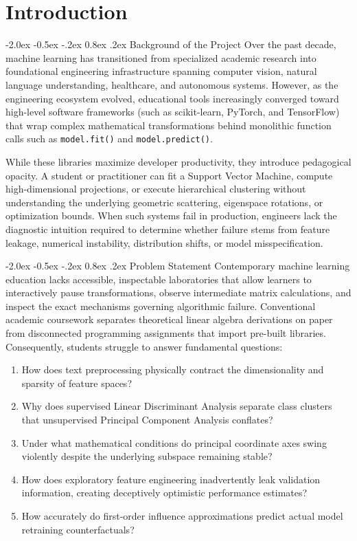 \documentclass[12pt,a4paper]{report}
\makeatletter
\newenvironment{tightenumerate}{%
  \begin{enumerate}%
    \setlength{\itemsep}{1.5pt}%
    \setlength{\parskip}{0pt}%
    \setlength{\parsep}{0pt}%
}{%
  \end{enumerate}%
}
\renewcommand\section{\@startsection {section}{1}{\z@}%
                                   {-2.0ex \@plus -0.5ex \@minus -.2ex}%
                                   {0.8ex \@plus.2ex}%
                                   {\normalfont\fontsize{14}{17}\bfseries\color{headerblue}}}
\makeatother
\begin{document}
\chapter{Introduction}

\section{Background of the Project}
Over the past decade, machine learning has transitioned from specialized academic research into foundational engineering infrastructure spanning computer vision, natural language understanding, healthcare, and autonomous systems. However, as the engineering ecosystem evolved, educational tools increasingly converged toward high-level software frameworks (such as scikit-learn, PyTorch, and TensorFlow) that wrap complex mathematical transformations behind monolithic function calls such as \texttt{model.fit()} and \texttt{model.predict()}. 

While these libraries maximize developer productivity, they introduce pedagogical opacity. A student or practitioner can fit a Support Vector Machine, compute high-dimensional projections, or execute hierarchical clustering without understanding the underlying geometric scattering, eigenspace rotations, or optimization bounds. When such systems fail in production, engineers lack the diagnostic intuition required to determine whether failure stems from feature leakage, numerical instability, distribution shifts, or model misspecification.

\section{Problem Statement}
Contemporary machine learning education lacks accessible, inspectable laboratories that allow learners to interactively pause transformations, observe intermediate matrix calculations, and inspect the exact mechanisms governing algorithmic failure. Conventional academic coursework separates theoretical linear algebra derivations on paper from disconnected programming assignments that import pre-built libraries. Consequently, students struggle to answer fundamental questions:
\begin{tightenumerate}
    \item How does text preprocessing physically contract the dimensionality and sparsity of feature spaces?
    \item Why does supervised Linear Discriminant Analysis separate class clusters that unsupervised Principal Component Analysis conflates?
    \item Under what mathematical conditions do principal coordinate axes swing violently despite the underlying subspace remaining stable?
    \item How does exploratory feature engineering inadvertently leak validation information, creating deceptively optimistic performance estimates?
    \item How accurately do first-order influence approximations predict actual model retraining counterfactuals?
\end{tightenumerate}
\end{document}

